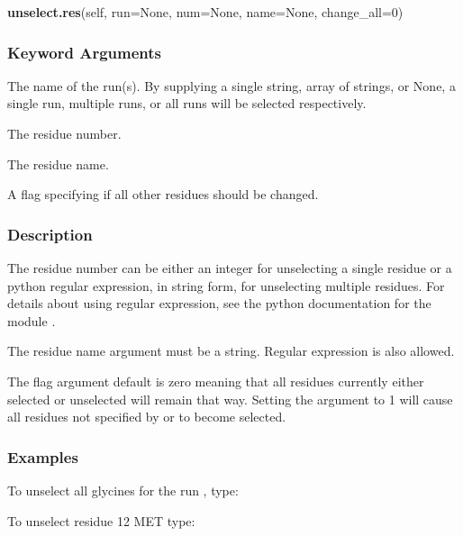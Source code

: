 \textsf{\textbf{unselect.res}(self, run=None, num=None, name=None, change\_all=0)}


\subsubsection{Keyword Arguments}

  The name of the run(s).  By supplying a single string, array of strings, or None, a single run, multiple runs, or all runs will be selected respectively. 

  The residue number. 

  The residue name. 

  A flag specifying if all other residues should be changed. 




\subsubsection{Description}

The residue number can be either an integer for unselecting a single residue or a python regular expression, in string form, for unselecting multiple residues.  For details about using regular expression, see the python documentation for the module .


The residue name argument must be a string.  Regular expression is also allowed.


The  flag argument default is zero meaning that all residues currently either selected or unselected will remain that way.  Setting the argument to 1 will cause all residues not specified by  or  to become selected.



\subsubsection{Examples}

To unselect all glycines for the run , type:




To unselect residue 12 MET type:


